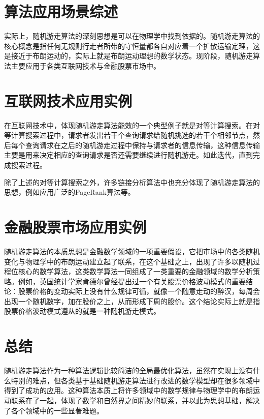 \documentclass{ctexart}
\begin{document}
\section{算法应用场景综述}
实际上，随机游走算法的深刻思想是可以在物理学中找到依据的。随机游走算法的核心概念是指任何无规则行走者所带的守恒量都各自对应着一个扩散运输定理，这是接近于布朗运动的，实际上就是布朗运动理想的数学状态。现阶段，随机游走算法主要应用于各类互联网技术与金融股票市场中。

\section{互联网技术应用实例}
在互联网技术中，体现随机游走算法能效的一个典型例子就是对等计算搜索。在对等计算搜索过程中，请求者发出若干个查询请求给随机挑选的若干个相邻节点，然后每个查询请求在之后的随机游走过程中保持与请求者的信息传输，这种信息传输主要是用来决定相应的查询请求是否还需要继续进行随机游走。如此迭代，直到完成搜索过程。

除了上述的对等计算搜索之外，许多链接分析算法中也充分体现了随机游走算法的思想，例如应用广泛的PageRank算法等。

\section{金融股票市场应用实例}
随机游走算法的本质思想是金融数学领域的一项重要假设，它把市场中的各类随机变化与物理学中的布朗运动建立起了联系，在这个基础之上，出现了许多以随机过程位核心的数学算法，这类数学算法一同组成了一类重要的金融领域的数学分析策略。例如，英国统计学家肯德尔曾经提出过一个有关股票价格波动模式的重要结论：股票价格的变动实际上没有什么规律可循，就像一个随意走动的醉汉，每周会出现一个随机数字，加在股价之上，从而形成下周的股价。这个结论实际上就是指股票价格波动模式遵从的就是一种随机游走模式。

\section{总结}
随机游走算法作为一种算法逻辑比较简洁的全局最优化算法，虽然在实现上没有什么特别的难点，但各类基于基础随机游走算法进行改进的数学模型却在很多领域中得到了成功的应用。这种算法本质上将许多领域中的数学规律与物理学中的布朗运动联系在了一起，体现了数学和自然界之间精妙的联系，并以此为思想基础，解决了各个领域中的一些显著难题。
\end{document}
